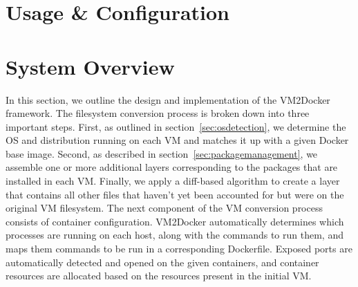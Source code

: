 \section{Usage \& Configuration}
\section{System Overview}

In this section, we outline the design and implementation of the VM2Docker framework. The filesystem conversion process is broken down into three important steps. First, as outlined in section~\ref{sec:osdetection}, we determine the OS and distribution running on each VM and matches it up with a given Docker base image. Second, as described in section~\ref{sec:packagemanagement}, we assemble one or more additional layers corresponding to the packages that are installed in each VM. Finally, we apply a diff-based algorithm to create a layer that contains all other files that haven't yet been accounted for but were on the original VM filesystem. The next component of the VM conversion process consists of container configuration. VM2Docker automatically determines which processes are running on each host, along with the commands to run them, and maps them commands to be run in a corresponding Dockerfile. Exposed ports are automatically detected and opened on the given containers, and container resources are allocated based on the resources present in the initial VM.

